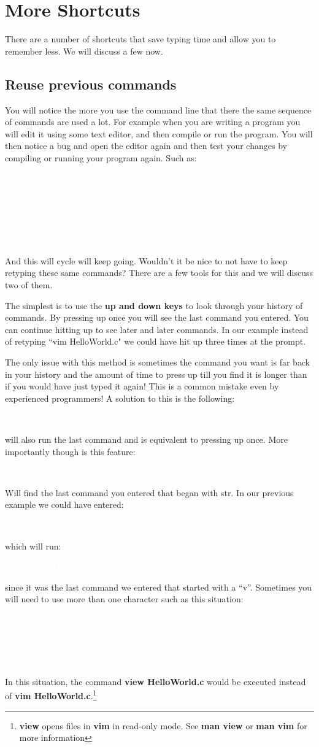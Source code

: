 \documentclass[oneside]{book}
\newcommand{\commandline}[1]{\begin{center} \colorbox{Dark}{\textcolor{white}{#1}} \end{center}}
\begin{document}
\newpage
\section{More Shortcuts}
There are a number of shortcuts that save typing time and allow you to remember less. We will discuss a few now.
\subsection{Reuse previous commands}
You will notice the more you use the command line that there the same sequence of commands are used a lot. For example when you are writing a program you will edit it using some text editor, and then compile or run the program. You will then notice a bug and open the editor again and then test your changes by compiling or running your program again. Such as:
\commandline{vim HelloWorld.c}
\commandline{gcc HelloWorld.c}
\commandline{./a.out}
\commandline{vim HelloWorld.c}
And this will cycle will keep going. Wouldn't it be nice to not have to keep retyping these same commands? There are a few tools for this and we will discuss two of them. 

The simplest is to use the \textbf{up and down keys} to look through your history of commands. By pressing up once you will see the last command you entered. You can continue hitting up to see later and later commands. In our example instead of retyping ``vim HelloWorld.c" we could have hit up three times at the prompt. 

The only issue with this method is sometimes the command you want is far back in your history and the amount of time to press up till you find it is longer than if you would have just typed it again! This is a common mistake even by experienced programmers! A solution to this is the following:
\commandline{!!}
will also run the last command and is equivalent to pressing up once. More importantly though is this feature:
\commandline{!str}
Will find the last command you entered that began with str. In our previous example we could have entered:
\commandline{!v}
which will run:
\commandline{vim HelloWorld.c}
since it was the last command we entered that started with a ``v''. Sometimes you will need to use more than one character such as this situation:
\commandline{vim HelloWorld.c}
\commandline{view HelloWorld.c}
\commandline{!v}

In this situation, the command \textbf{view HelloWorld.c} would be executed instead of \textbf{vim HelloWorld.c}.\footnote{\textbf{view} opens files in \textbf{vim} in read-only mode. See \textbf{man view} or \textbf{man vim} for more information}
\end{document}
